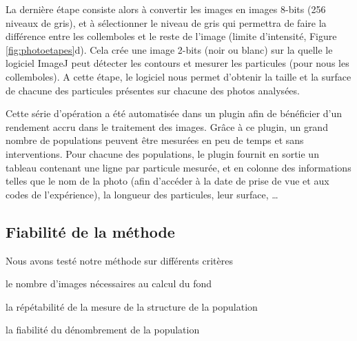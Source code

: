 La dernière étape consiste alors à convertir les images en images 8-bits (256
niveaux de gris), et à sélectionner le niveau de gris qui permettra de faire la
différence entre les collemboles et le reste de l'image (limite d'intensité,
Figure \ref{fig:photoetapes}d). Cela crée une image 2-bits (noir ou blanc) sur
la quelle le logiciel ImageJ peut détecter les contours et mesurer les
particules (pour nous les collemboles). A cette étape, le logiciel nous permet
d'obtenir la taille et la surface de chacune des particules présentes sur
chacune des photos analysées.

Cette série d'opération a été automatisée dans un plugin afin de bénéficier d'un
rendement accru dans le traitement des images. Grâce à ce plugin, un grand
nombre de populations peuvent être mesurées en peu de temps et sans
interventions. Pour chacune des populations, le plugin fournit en sortie un
tableau contenant une ligne par particule mesurée, et en colonne des
informations telles que le nom de la photo (afin d'accéder à la date de prise
de vue et aux codes de l'expérience), la longueur des particules, leur
surface, \ldots

\subsection{Fiabilité de la méthode}

Nous avons testé notre méthode sur différents critères \begin{enumerate*}[label=(\roman*), before=\unskip{ : }, itemjoin={{ ; }},
itemjoin*={{ ; et }}] 
\item le nombre d'images nécessaires au calcul du fond
\item la répétabilité de la mesure de la structure de la population
\item la fiabilité du dénombrement de la population
\end{enumerate*}

